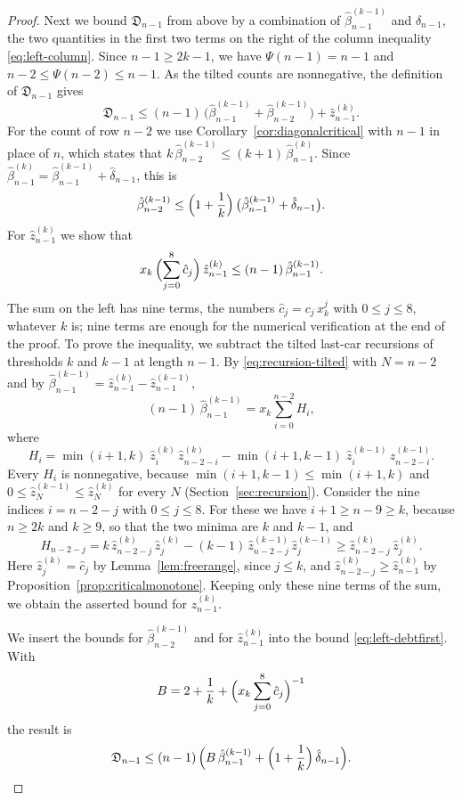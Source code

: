 \documentclass{amsart}
\theoremstyle{definition}
\theoremstyle{remark}
\numberwithin{equation}{section}
\begin{document}
\begin{proof}
Next we bound $\mathfrak D_{n-1}$ from above by a combination of $\hat\beta^{(k-1)}_{n-1}$ and $\hat\delta_{n-1}$, the two quantities in the first two terms on the right of the column inequality \eqref{eq:left-column}. Since $n-1\ge 2k-1$, we have $\Psi(n-1)=n-1$ and $n-2\le\Psi(n-2)\le n-1$. As the tilted counts are nonnegative, the definition of $\mathfrak D_{n-1}$ gives
\begin{equation}\label{eq:left-debtfirst}
\mathfrak D_{n-1}\le(n-1)\,\bigl(\hat\beta^{(k-1)}_{n-1}+\hat\beta^{(k-1)}_{n-2}\bigr)+\hat z^{(k)}_{n-1}.
\end{equation}
For the count of row $n-2$ we use Corollary~\ref{cor:diagonalcritical} with $n-1$ in place of $n$, which states that $k\,\hat\beta^{(k-1)}_{n-2}\le(k+1)\,\hat\beta^{(k)}_{n-1}$. Since $\hat\beta^{(k)}_{n-1}=\hat\beta^{(k-1)}_{n-1}+\hat\delta_{n-1}$, this is
\[
\hat\beta^{(k-1)}_{n-2}\le\Bigl(1+\frac1k\Bigr)\,\bigl(\hat\beta^{(k-1)}_{n-1}+\hat\delta_{n-1}\bigr).
\]
For $\hat z^{(k)}_{n-1}$ we show that
\[
x_k\,\Bigl(\sum_{j=0}^{8}\hat c_j\Bigr)\,\hat z^{(k)}_{n-1}\le(n-1)\,\hat\beta^{(k-1)}_{n-1}.
\]
The sum on the left has nine terms, the numbers $\hat c_j=c_j\,x_k^{j}$ with $0\le j\le 8$, whatever $k$ is; nine terms are enough for the numerical verification at the end of the proof. To prove the inequality, we subtract the tilted last-car recursions of thresholds $k$ and $k-1$ at length $n-1$. By \eqref{eq:recursion-tilted} with $N=n-2$ and by $\hat\beta^{(k-1)}_{n-1}=\hat z^{(k)}_{n-1}-\hat z^{(k-1)}_{n-1}$,
\[
(n-1)\,\hat\beta^{(k-1)}_{n-1}=x_k\sum_{i=0}^{n-2}H_i ,
\]
where
\[
H_i=\min(i+1,k)\;\hat z^{(k)}_i\,\hat z^{(k)}_{n-2-i}-\min(i+1,k-1)\;\hat z^{(k-1)}_i\,\hat z^{(k-1)}_{n-2-i}.
\]
Every $H_i$ is nonnegative, because $\min(i+1,k-1)\le\min(i+1,k)$ and $0\le\hat z^{(k-1)}_N\le\hat z^{(k)}_N$ for every $N$ (Section~\ref{sec:recursion}). Consider the nine indices $i=n-2-j$ with $0\le j\le 8$. For these we have $i+1\ge n-9\ge k$, because $n\ge 2k$ and $k\ge 9$, so that the two minima are $k$ and $k-1$, and
\[
H_{n-2-j}=k\,\hat z^{(k)}_{n-2-j}\,\hat z^{(k)}_j-(k-1)\,\hat z^{(k-1)}_{n-2-j}\,\hat z^{(k-1)}_j\ge\hat z^{(k)}_{n-2-j}\,\hat z^{(k)}_j .
\]
Here $\hat z^{(k)}_j=\hat c_j$ by Lemma~\ref{lem:freerange}, since $j\le k$, and $\hat z^{(k)}_{n-2-j}\ge\hat z^{(k)}_{n-1}$ by Proposition~\ref{prop:criticalmonotone}. Keeping only these nine terms of the sum, we obtain the asserted bound for $\hat z^{(k)}_{n-1}$.

We insert the bounds for $\hat\beta^{(k-1)}_{n-2}$ and for $\hat z^{(k)}_{n-1}$ into the bound \eqref{eq:left-debtfirst}. With
\[
B=2+\frac1k+\Bigl(x_k\sum_{j=0}^{8}\hat c_j\Bigr)^{-1}
\]
the result is
\[
\mathfrak D_{n-1}\le(n-1)\,\Bigl(B\,\hat\beta^{(k-1)}_{n-1}+\Bigl(1+\frac1k\Bigr)\,\hat\delta_{n-1}\Bigr).
\]


\end{proof}
\end{document}
